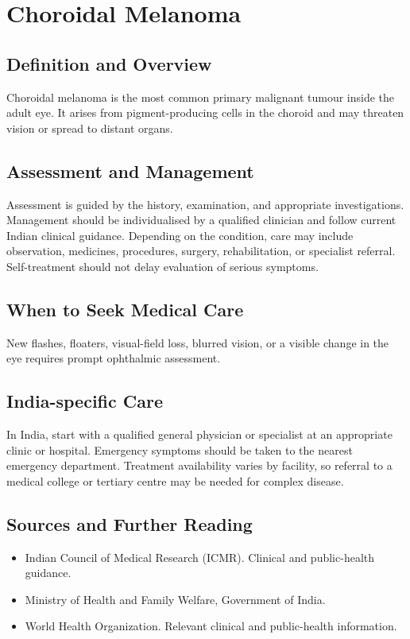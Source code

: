 \chapter{Choroidal Melanoma}

\section*{Definition and Overview}
Choroidal melanoma is the most common primary malignant tumour inside the adult eye. It arises from pigment-producing cells in the choroid and may threaten vision or spread to distant organs.

\section*{Assessment and Management}
Assessment is guided by the history, examination, and appropriate investigations. Management should be individualised by a qualified clinician and follow current Indian clinical guidance. Depending on the condition, care may include observation, medicines, procedures, surgery, rehabilitation, or specialist referral. Self-treatment should not delay evaluation of serious symptoms.

\section*{When to Seek Medical Care}
New flashes, floaters, visual-field loss, blurred vision, or a visible change in the eye requires prompt ophthalmic assessment.

\section*{India-specific Care}
In India, start with a qualified general physician or specialist at an appropriate clinic or hospital. Emergency symptoms should be taken to the nearest emergency department. Treatment availability varies by facility, so referral to a medical college or tertiary centre may be needed for complex disease.

\section*{Sources and Further Reading}
\begin{itemize}
    \item Indian Council of Medical Research (ICMR). Clinical and public-health guidance.
    \item Ministry of Health and Family Welfare, Government of India.
    \item World Health Organization. Relevant clinical and public-health information.
\end{itemize}


